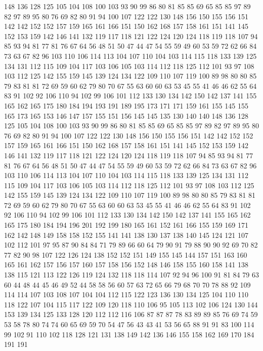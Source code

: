 148 136 128 125 105 104 108 100 103 93 90 99 86 80 81 85 85 69 65 85
85 97 89 82 97 89 95 80 76 69 82 80 91 94 100 107 122 122 130 148
156 150 155 156 151 142 142 152 152 157 159 165 161 166 151 150 162 168 157 158
161 151 141 145 152 153 159 142 146 141 132 119 117 118 121 122 124 120 124 118
119 118 107 94 85 93 94 81 77 81 76 67 64 56 48 51 50 47 44 47
54 55 59 49 60 53 59 72 62 66 84 73 63 67 82 96 103 110 106 114
113 104 107 110 104 103 114 115 118 133 139 125 134 131 112 115 109 104 117 103
106 105 103 114 112 118 125 112 101 93 97 108 103 112 125 142 155 159 145 139
124 134 122 109 110 107 119 100 89 98 80 80 85 79 83 81 81 72 69 59
60 62 79 80 70 67 55 63 60 60 63 53 45 55 41 46 46 62 55 64
83 91 102 92 106 110 94 102 99 106 101 112 133 130 134 142 150 142 137 141
155 165 162 165 175 180 184 194 193 191 189 195 173 171 171 159 161 155 145 155
165 173 165 153 146 147 157 155 151 156 145 145 135 130 140 140 148 136 128 125
105 104 108 100 103 93 90 99 86 80 81 85 85 69 65 85 85 97 89 82
97 89 95 80 76 69 82 80 91 94 100 107 122 122 130 148 156 150 155 156
151 142 142 152 152 157 159 165 161 166 151 150 162 168 157 158 161 151 141 145
152 153 159 142 146 141 132 119 117 118 121 122 124 120 124 118 119 118 107 94
85 93 94 81 77 81 76 67 64 56 48 51 50 47 44 47 54 55 59 49
60 53 59 72 62 66 84 73 63 67 82 96 103 110 106 114 113 104 107 110
104 103 114 115 118 133 139 125 134 131 112 115 109 104 117 103 106 105 103 114
112 118 125 112 101 93 97 108 103 112 125 142 155 159 145 139 124 134 122 109
110 107 119 100 89 98 80 80 85 79 83 81 81 72 69 59 60 62 79 80
70 67 55 63 60 60 63 53 45 55 41 46 46 62 55 64 83 91 102 92
106 110 94 102 99 106 101 112 133 130 134 142 150 142 137 141 155 165 162 165
175 180 184 194 196 201 192 199 180 165 161 152 161 166 155 159 169 171 162 142
148 149 158 158 152 155 141 141 138 130 137 138 140 145 124 121 107 102 112 101
97 95 87 90 84 84 71 79 89 66 60 64 79 90 91 79 88 90 90 92
69 70 82 77 82 90 98 107 122 126 124 138 152 152 151 149 155 145 144 157
151 163 160 165 161 162 157 156 157 160 157 158 156 152 148 146 158 155 160 158
141 138 138 115 121 113 122 126 119 124 132 118 118 114 107 92 94 96 100 91
81 84 79 63 60 44 48 44 45 46 49 52 44 58 58 56 60 57 63 72
65 66 79 68 70 70 78 88 92 109 114 114 107 103 108 107 104 104 112 115
122 123 136 130 134 125 104 110 110 118 122 107 104 115 117 122 109 120 118 110
106 95 105 113 102 106 124 130 144 153 139 134 125 133 128 120 112 112 116 106
87 87 87 78 83 89 89 85 76 69 74 59 53 58 78 80 74 74 60 65
69 59 70 54 47 56 43 43 41 53 56 65 88 91 91 83 100 114 99 102
91 110 102 118 128 121 131 138 149 142 136 146 155 158 162 169 170 184 191 191

